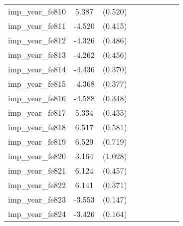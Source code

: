 {\begin{tabular}{l*{4}{cc}}
imp\_year\_fe810&    5.387\sym{***}&  (0.520)&                  &         &                  &         &                  &         \\
imp\_year\_fe811&   -4.520\sym{***}&  (0.415)&                  &         &                  &         &                  &         \\
imp\_year\_fe812&   -4.326\sym{***}&  (0.486)&                  &         &                  &         &                  &         \\
imp\_year\_fe813&   -4.262\sym{***}&  (0.456)&                  &         &                  &         &                  &         \\
imp\_year\_fe814&   -4.436\sym{***}&  (0.370)&                  &         &                  &         &                  &         \\
imp\_year\_fe815&   -4.368\sym{***}&  (0.377)&                  &         &                  &         &                  &         \\
imp\_year\_fe816&   -4.588\sym{***}&  (0.348)&                  &         &                  &         &                  &         \\
imp\_year\_fe817&    5.334\sym{***}&  (0.435)&                  &         &                  &         &                  &         \\
imp\_year\_fe818&    6.517\sym{***}&  (0.581)&                  &         &                  &         &                  &         \\
imp\_year\_fe819&    6.529\sym{***}&  (0.719)&                  &         &                  &         &                  &         \\
imp\_year\_fe820&    3.164\sym{**} &  (1.028)&                  &         &                  &         &                  &         \\
imp\_year\_fe821&    6.124\sym{***}&  (0.457)&                  &         &                  &         &                  &         \\
imp\_year\_fe822&    6.141\sym{***}&  (0.371)&                  &         &                  &         &                  &         \\
imp\_year\_fe823&   -3.553\sym{***}&  (0.147)&                  &         &                  &         &                  &         \\
imp\_year\_fe824&   -3.426\sym{***}&  (0.164)&                  &         &                  &         &                  &         \\

\end{tabular}}
